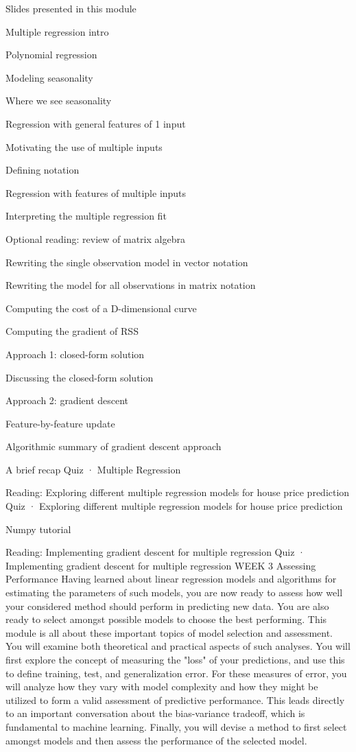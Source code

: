 \item Slides presented in this module
\item Multiple regression intro
\item Polynomial regression
\item Modeling seasonality
\item Where we see seasonality
\item Regression with general features of 1 input
\item Motivating the use of multiple inputs
\item Defining notation
\item Regression with features of multiple inputs
\item Interpreting the multiple regression fit
\item Optional reading: review of matrix algebra
\item Rewriting the single observation model in vector notation
\item Rewriting the model for all observations in matrix notation
\item Computing the cost of a D-dimensional curve
\item Computing the gradient of RSS
\item Approach 1: closed-form solution
\item Discussing the closed-form solution
\item Approach 2: gradient descent
\item Feature-by-feature update
\item Algorithmic summary of gradient descent approach
\item A brief recap
Quiz · Multiple Regression
\item Reading: Exploring different multiple regression models for house price prediction
Quiz · Exploring different multiple regression models for house price prediction
\item Numpy tutorial
\item Reading: Implementing gradient descent for multiple regression
Quiz · Implementing gradient descent for multiple regression
WEEK 3
Assessing Performance
Having learned about linear regression models and algorithms for estimating the parameters of such models, you are now ready to assess how well your considered method should perform in predicting new data. You are also ready to select amongst possible models to choose the best performing.
This module is all about these important topics of model selection and assessment. You will examine both theoretical and practical aspects of such analyses. You will first explore the concept of measuring the "loss" of your predictions, and use this to define training, test, and generalization error. For these measures of error, you will analyze how they vary with model complexity and how they might be utilized to form a valid assessment of predictive performance. This leads directly to an important conversation about the bias-variance tradeoff, which is fundamental to machine learning. Finally, you will devise a method to first select amongst models and then assess the performance of the selected model.

